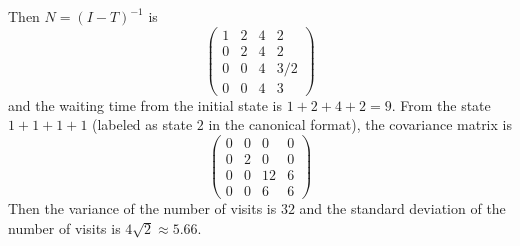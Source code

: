 \documentclass[12pt]{article}
\begin{document}
\begin{example}
    Then \( N = (I-T)^{-1} \) is
    \[
        \begin{pmatrix}
            1 & 2 & 4 & 2\\
            0 & 2 & 4 & 2\\
            0 & 0 & 4 & 3/2\\
            0 & 0 & 4 & 3
        \end{pmatrix}
    \] and the waiting time from the initial state is \( 1 + 2 + 4 + 2 =
    9\).   From the state \( 1+1+1+1 \) (labeled as state \( 2 \) in the
    canonical format), the covariance matrix is
    \[
        \begin{pmatrix}
            0 & 0 & 0  & 0\\
            0 & 2 & 0  & 0\\
            0 & 0 & 12 & 6\\
            0 & 0 & 6  & 6
        \end{pmatrix}
    \] Then the variance of the number of visits is \( 32 \)  and the
    standard deviation of the number of visits is \( 4 \sqrt{2}
    \approx 5.66 \). 

\end{example}
\end{document}

